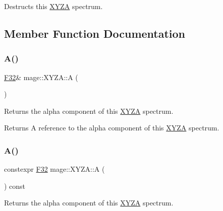 Destructs this \mbox{\hyperlink{structmage_1_1_x_y_z_a}{X\+Y\+ZA}} spectrum. 

\subsection{Member Function Documentation}
\mbox{\label{structmage_1_1_x_y_z_a_ac3680d370c4b74524aff2b64ec12a2e6}} 
\subsubsection{\texorpdfstring{A()}{A()}\hspace{0.1cm}{\footnotesize\ttfamily [1/2]}}
{\footnotesize\ttfamily \mbox{\hyperlink{namespacemage_aa97e833b45f06d60a0a9c4fc22ae02c0}{F32}}\& mage\+::\+X\+Y\+Z\+A\+::A (\begin{DoxyParamCaption}{ }\end{DoxyParamCaption})\hspace{0.3cm}{\ttfamily [noexcept]}}

Returns the alpha component of this \mbox{\hyperlink{structmage_1_1_x_y_z_a}{X\+Y\+ZA}} spectrum.

\begin{DoxyReturn}{Returns}
A reference to the alpha component of this \mbox{\hyperlink{structmage_1_1_x_y_z_a}{X\+Y\+ZA}} spectrum. 
\end{DoxyReturn}
\mbox{\label{structmage_1_1_x_y_z_a_a7be53362c6056b51902b2e811fdad133}} 
\subsubsection{\texorpdfstring{A()}{A()}\hspace{0.1cm}{\footnotesize\ttfamily [2/2]}}
{\footnotesize\ttfamily constexpr \mbox{\hyperlink{namespacemage_aa97e833b45f06d60a0a9c4fc22ae02c0}{F32}} mage\+::\+X\+Y\+Z\+A\+::A (\begin{DoxyParamCaption}{ }\end{DoxyParamCaption}) const\hspace{0.3cm}{\ttfamily [noexcept]}}

Returns the alpha component of this \mbox{\hyperlink{structmage_1_1_x_y_z_a}{X\+Y\+ZA}} spectrum.

